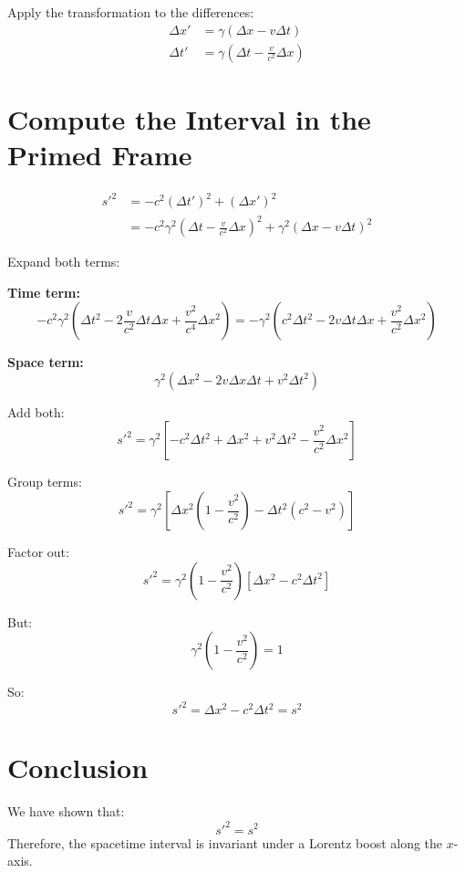 \documentclass{article}
\begin{document}
	Apply the transformation to the differences:
	\[
	\begin{aligned}
		\Delta x' &= \gamma(\Delta x - v \Delta t) \\
		\Delta t' &= \gamma\left(\Delta t - \frac{v}{c^2} \Delta x\right)
	\end{aligned}
	\]
	
	\section*{Compute the Interval in the Primed Frame}
	
	\[
	\begin{aligned}
		s'^2 &= -c^2 (\Delta t')^2 + (\Delta x')^2 \\
		&= -c^2 \gamma^2 \left(\Delta t - \frac{v}{c^2} \Delta x\right)^2 + \gamma^2 (\Delta x - v \Delta t)^2
	\end{aligned}
	\]
	
	Expand both terms:
	
	\textbf{Time term:}
	\[
	-c^2 \gamma^2 \left(\Delta t^2 - 2\frac{v}{c^2} \Delta t \Delta x + \frac{v^2}{c^4} \Delta x^2\right)
	= -\gamma^2 \left(c^2 \Delta t^2 - 2v \Delta t \Delta x + \frac{v^2}{c^2} \Delta x^2\right)
	\]
	
	\textbf{Space term:}
	\[
	\gamma^2 \left(\Delta x^2 - 2v \Delta x \Delta t + v^2 \Delta t^2\right)
	\]
	
	Add both:
	\[
	s'^2 = \gamma^2 \left[ -c^2 \Delta t^2 + \Delta x^2 + v^2 \Delta t^2 - \frac{v^2}{c^2} \Delta x^2 \right]
	\]
	
	Group terms:
	\[
	s'^2 = \gamma^2 \left[ \Delta x^2 \left(1 - \frac{v^2}{c^2}\right) - \Delta t^2 \left(c^2 - v^2\right) \right]
	\]
	
	Factor out:
	\[
	s'^2 = \gamma^2 \left(1 - \frac{v^2}{c^2}\right) \left[ \Delta x^2 - c^2 \Delta t^2 \right]
	\]
	
	But:
	\[
	\gamma^2 \left(1 - \frac{v^2}{c^2}\right) = 1
	\]
	
	So:
	\[
	s'^2 = \Delta x^2 - c^2 \Delta t^2 = s^2
	\]
	
	\section*{Conclusion}
	
	We have shown that:
	\[
	s'^2 = s^2
	\]
	Therefore, the spacetime interval is invariant under a Lorentz boost along the $x$-axis.
	
 	
\end{document}
